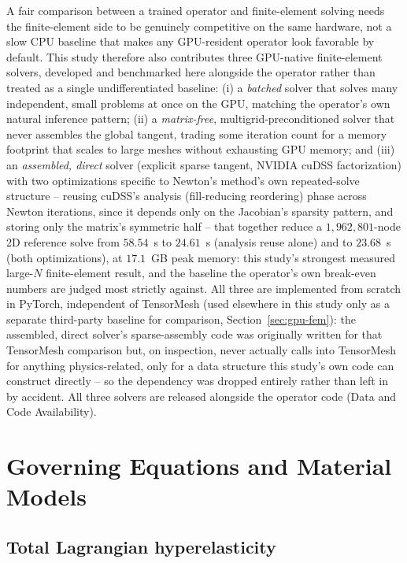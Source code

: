 \documentclass[final,5p,times]{elsarticle}
\begin{document}
A fair comparison between a trained operator and finite-element solving
needs the finite-element side to be genuinely competitive on the same
hardware, not a slow CPU baseline that makes any GPU-resident operator
look favorable by default. This study therefore also contributes three
GPU-native finite-element solvers, developed and benchmarked here
alongside the operator rather than treated as a single undifferentiated
baseline: (i) a \emph{batched} solver that solves many independent,
small problems at once on the GPU, matching the operator's own natural
inference pattern; (ii) a \emph{matrix-free}, multigrid-preconditioned
solver that never assembles the global tangent, trading some iteration
count for a memory footprint that scales to large meshes without
exhausting GPU memory; and (iii) an \emph{assembled, direct} solver
(explicit sparse tangent, NVIDIA cuDSS factorization) with two
optimizations specific to Newton's method's own repeated-solve
structure -- reusing cuDSS's analysis (fill-reducing reordering) phase
across Newton iterations, since it depends only on the Jacobian's
sparsity pattern, and storing only the matrix's symmetric half -- that
together reduce a $1{,}962{,}801$-node 2D reference solve from $58.54$~s
to $24.61$~s (analysis reuse alone) and to $23.68$~s (both
optimizations), at $17.1$~GB peak memory: this study's strongest
measured large-$N$ finite-element result, and the baseline the
operator's own break-even numbers are judged most strictly against.
All three are implemented from scratch in PyTorch, independent of
TensorMesh (used elsewhere in this study only as a separate third-party
baseline for comparison, Section~\ref{sec:gpu-fem}): the
assembled, direct solver's sparse-assembly code was originally written
for that TensorMesh comparison but, on inspection, never actually calls
into TensorMesh for anything physics-related, only for a data structure
this study's own code can construct directly -- so the dependency was
dropped entirely rather than left in by accident. All three solvers are
released alongside the operator code (Data and Code Availability).

\FloatBarrier
\section{Governing Equations and Material Models}
\label{sec:governing}

\subsection{Total Lagrangian hyperelasticity}
\label{sec:total-lagrangian}
\end{document}
